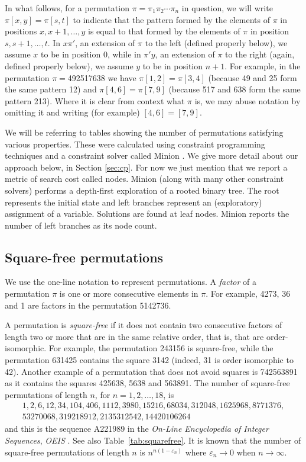 \documentclass[12pt,reqno]{article}
\begin{document}
In what follows, for a permutation $\pi=\pi_1\pi_2\cdots\pi_n$ in question, we will write $\pi[x, y]=\pi[s, t]$ to indicate that the pattern formed by the elements of $\pi$ in positions $x,x+1,\ldots,y$  is equal to that formed by the elements of $\pi$ in position $s,s+1,\ldots,t$. In $x\pi'$, an extension of $\pi$ to the left (defined properly below), we assume $x$ to be in position 0, while in $\pi'y$, an extension of $\pi$ to the right (again, defined properly below), we assume $y$ to be in position $n+1$. For example, in the permutation $\pi=$492517638 we have $\pi[1,2]=\pi[3,4]$ (because 49 and 25 form the same pattern 12) and $\pi[4,6]=\pi[7,9]$ (because 517 and 638 form the same pattern 213). Where it is clear from context what $\pi$ is, we may abuse notation by omitting it and writing (for example) $[4,6]=[7,9]$.

We will be referring to tables showing the number of permutations satisfying various properties. 
These were calculated using constraint programming techniques and a constraint solver called Minion \cite{minion}.
We give more detail about our approach below, in Section \ref{sec:cp}. 
For now we just mention that
we report a metric of search cost called  nodes. 
Minion (along with many other constraint solvers) performs a depth-first exploration of a rooted binary tree. 
The root represents the initial state and left branches represent an (exploratory) assignment of a variable. Solutions are found at leaf nodes. Minion reports the number of left branches as its node count.   


\subsection{Square-free permutations}\label{square-free-perms} 

We use the one-line notation to represent permutations. A {\em factor} of a permutation $\pi$ is one or more consecutive elements in $\pi$. For example, 4273, 36 and 1 are factors in the permutation 5142736.

A permutation is {\em square-free} if it does not contain two consecutive factors of length two or more that are in the same relative order, that is, that are order-isomorphic. For example, the permutation 243156 is square-free, while the permutation 631425 contains the square 3142 (indeed, 31 is order isomorphic to 42). Another example of a permutation that does not avoid squares is 742563891 as it contains the squares 425638, 5638 and 563891. The number of square-free permutations of length $n$, for $n=1,2,\ldots, 18$, is 
$$\begin{array}{c}1, 2, 6, 12, 34, 104, 406, 1112, 3980, 15216, 68034, 312048, 1625968, 8771376, \\
53270068, 319218912, 2135312542, 14420106264\end{array}$$
and this is the sequence  A221989 in the {\em On-Line Encyclopedia of Integer Sequences}, {\em OEIS} \cite{OEIS}. See also Table~\ref{tab:squarefree}. It is known \cite{AKPV} that  the number of square-free permutations
of length $n$ is $n^{n(1-\varepsilon_n)}$ where
$\varepsilon_n\rightarrow
0$ when $n\rightarrow\infty$. 
\end{document}
